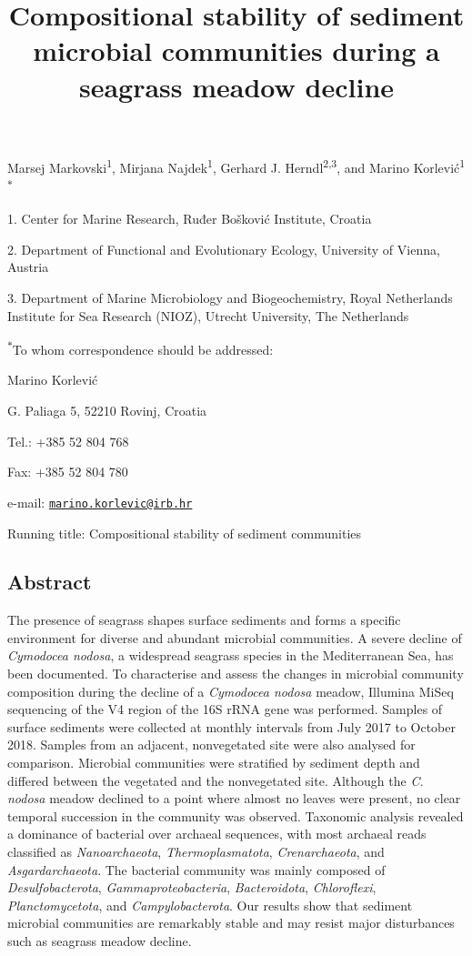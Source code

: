 \documentclass[12pt,]{article}
\title{\textbf{Compositional stability of sediment microbial communities during
a seagrass meadow decline}}
\author{}
\date{\vspace{-2.5em}}
\begin{document}
\maketitle

\vspace{20mm}

Marsej Markovski\textsuperscript{1}, Mirjana Najdek\textsuperscript{1},
Gerhard J. Herndl\textsuperscript{2,3}, and Marino
Korlević\textsuperscript{1\(*\)}

1. Center for Marine Research, Ruđer Bošković Institute, Croatia

2. Department of Functional and Evolutionary Ecology, University of
Vienna, Austria

3. Department of Marine Microbiology and Biogeochemistry, Royal
Netherlands Institute for Sea Research (NIOZ), Utrecht University, The
Netherlands

\textsuperscript{\(*\)}To whom correspondence should be addressed:

Marino Korlević

G. Paliaga 5, 52210 Rovinj, Croatia

Tel.: +385 52 804 768

Fax: +385 52 804 780

e-mail:
\href{mailto:marino.korlevic@irb.hr}{\nolinkurl{marino.korlevic@irb.hr}}

Running title: Compositional stability of sediment communities

\newpage
\linenumbers
{}
\setlength\parindent{24pt}

\hypertarget{abstract}{%
\subsection{Abstract}\label{abstract}}

The presence of seagrass shapes surface sediments and forms a specific
environment for diverse and abundant microbial communities. A severe
decline of \emph{Cymodocea nodosa}, a widespread seagrass species in the
Mediterranean Sea, has been documented. To characterise and assess the
changes in microbial community composition during the decline of a
\emph{Cymodocea nodosa} meadow, Illumina MiSeq sequencing of the V4
region of the 16S rRNA gene was performed. Samples of surface sediments
were collected at monthly intervals from July 2017 to October 2018.
Samples from an adjacent, nonvegetated site were also analysed for
comparison. Microbial communities were stratified by sediment depth and
differed between the vegetated and the nonvegetated site. Although the
\emph{C. nodosa} meadow declined to a point where almost no leaves were
present, no clear temporal succession in the community was observed.
Taxonomic analysis revealed a dominance of bacterial over archaeal
sequences, with most archaeal reads classified as \emph{Nanoarchaeota},
\emph{Thermoplasmatota}, \emph{Crenarchaeota}, and
\emph{Asgardarchaeota}. The bacterial community was mainly composed of
\emph{Desulfobacterota}, \emph{Gammaproteobacteria},
\emph{Bacteroidota}, \emph{Chloroflexi}, \emph{Planctomycetota}, and
\emph{Campylobacterota}. Our results show that sediment microbial
communities are remarkably stable and may resist major disturbances such
as seagrass meadow decline.
\end{document}
